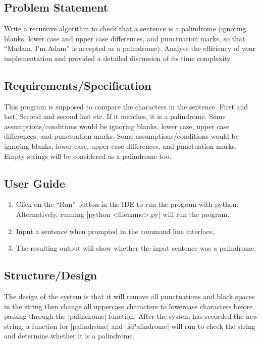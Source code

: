 \documentclass{report}
\begin{document}
\chapter{}
\section{Problem Statement}
Write a recursive algorithm to check that a sentence is a palindrome (ignoring blanks, lower case and upper case differences, and punctuation marks, so that ``Madam, I'm Adam'' is accepted as a palindrome). Analyse the efficiency of your implementation and provided a detailed discussion of its time complexity.
\section{Requirements/Specification}
This program is supposed to compare the characters in the sentence. First and last, Second and second last etc. If it matches, it is a palindrome. Some assumptions/conditions would be ignoring blanks, lower case, upper case differences, and punctuation marks. Some assumptions/conditions would be ignoring blanks, lower case, upper case differences, and punctuation marks. Empty strings will be considered as a palindrome too.
\section{User Guide}
\begin{enumerate}
	\item Click on the ``Run'' button in the IDE to run the program with python. Alternatively, running |python <filename>.py| will run the program.
	\item Input a sentence when prompted in the command line interface.
	\item The resulting output will show whether the input sentence was a palindrome.
\end{enumerate}
\section{Structure/Design}
The design of the system is that it will remove all punctuations and black spaces in the string then change all uppercase characters to lowercase characters before passing through the |palindrome| function. After the system has recorded the new string, a function for |palindrome| and |isPalindrome| will run to check the string and determine whether it is a palindrome.
\end{document}
